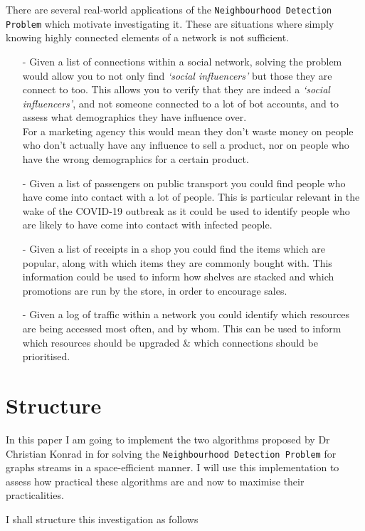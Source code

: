 \documentclass[11pt,twoside,a4paper]{report}
\begin{document}
There are several real-world applications of the \texttt{Neighbourhood Detection Problem} which motivate investigating it. These are situations where simply knowing highly connected elements of a network is not sufficient.
\begin{itemize}
	\item[-] Given a list of connections within a social network, solving the problem would allow you to not only find \textit{`social influencers'} but those they are connect to too. This allows you to verify that they are indeed a \textit{`social influencers'}, and not someone connected to a lot of bot accounts, and to assess what demographics they have influence over.\\
	For a marketing agency this would mean they don't waste money on people who don't actually have any influence to sell a product, nor on people who have the wrong demographics for a certain product.
	\item[-] Given a list of passengers on public transport you could find people who have come into contact with a lot of people. This is particular relevant in the wake of the COVID-19 outbreak as it could be used to identify people who are likely to have come into contact with infected people. %
	\item[-] Given a list of receipts in a shop you could find the items which are popular, along with which items they are commonly bought with. This information could be used to inform how shelves are stacked and which promotions are run by the store, in order to encourage sales.
	\item[-] Given a log of traffic within a network you could identify which resources are being accessed most often, and by whom. This can be used to inform which resources should be upgraded \& which connections should be prioritised.
\end{itemize}

\section{Structure} %
In this paper I am going to implement the two algorithms proposed by Dr Christian Konrad in \cite{orig} for solving the \texttt{Neighbourhood Detection Problem} for graphs streams in a space-efficient manner. I will use this implementation to assess how practical these algorithms are and now to maximise their practicalities.
\par I shall structure this investigation as follows
\end{document}
